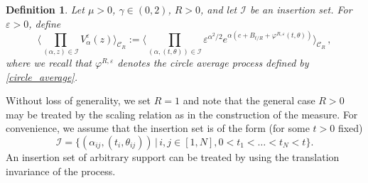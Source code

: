 \documentclass[11pt]{amsart}
\numberwithin{equation}{section}
\newtheorem{definition}[theorem]{Definition}
\theoremstyle{definition}
\newcommand{\cjd}{\rangle}
\newcommand{\cjg}{\langle}
\newcommand{\mc}{\mathcal}
\def\eps{\varepsilon}
\begin{document}
\begin{definition}
Let $\mu > 0$, $\gamma \in (0,2)$, $R>0$, and let $\mathcal{I}$ be an insertion set. For $\eps > 0$, define
\begin{equation} \label{def: vertex prelimit}
\Big\cjg \prod_{(\alpha,z)\in \mc{I}}V^\eps_{\alpha}(z)\Big\cjd_{\mc{C}_R} :=
\Big\langle \prod_{(\alpha, (t, \theta)) \in \mathcal{I}}\eps^{\alpha^2/2}e^{\alpha (c+ B_{t/R} +  \varphi^{R,\eps}(t,\theta)) } \Big\rangle_{\mc{C}_R}\, ,
\end{equation}
where we recall that $\varphi^{R,\eps}$ denotes the circle average process defined by \eqref{circle_average}.
\end{definition}
Without loss of generality, we set $R=1$ and note that the general case $R>0$ may be treated by the scaling relation as in the construction of the measure. For convenience, we assume that the insertion set is of the form (for some $t>0$ fixed)
\begin{equation}\label{defmcI}
\mathcal I
=
\{ (\alpha_{ij}, (t_i, \theta_{ij})) \,|\,  i,j\in [1,N],  0 < t_1 < \dots < t_N<t \}.	
\end{equation}
An insertion set of arbitrary support can be treated by using the translation invariance of the process.
\end{document}
